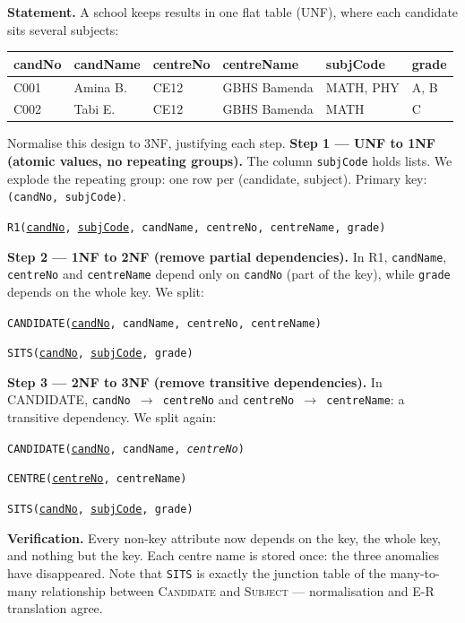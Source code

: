 \documentclass[11pt]{article}
\begin{document}
\begin{exoresolu}
\textbf{Statement.} A school keeps results in one flat table (UNF), where each candidate sits several subjects:

\begin{center}\small
\begin{tabular}{|l|l|l|l|l|l|}
\hline
\rowcolor{popblueL} candNo & candName & centreNo & centreName & subjCode & grade \\
\hline
C001 & Amina B. & CE12 & GBHS Bamenda & MATH, PHY & A, B \\
C002 & Tabi E. & CE12 & GBHS Bamenda & MATH & C \\
\hline
\end{tabular}
\end{center}

Normalise this design to 3NF, justifying each step.
\tcblower
\textbf{Step 1 — UNF to 1NF (atomic values, no repeating groups).} The column \texttt{subjCode} holds lists. We explode the repeating group: one row per (candidate, subject). Primary key: \texttt{(candNo, subjCode)}.

\texttt{R1(\underline{candNo}, \underline{subjCode}, candName, centreNo, centreName, grade)}

\textbf{Step 2 — 1NF to 2NF (remove partial dependencies).} In R1, \texttt{candName}, \texttt{centreNo} and \texttt{centreName} depend only on \texttt{candNo} (part of the key), while \texttt{grade} depends on the whole key. We split:

\texttt{CANDIDATE(\underline{candNo}, candName, centreNo, centreName)}

\texttt{SITS(\underline{candNo}, \underline{subjCode}, grade)}

\textbf{Step 3 — 2NF to 3NF (remove transitive dependencies).} In CANDIDATE, \texttt{candNo $\to$ centreNo} and \texttt{centreNo $\to$ centreName}: a transitive dependency. We split again:

\texttt{CANDIDATE(\underline{candNo}, candName, \emph{centreNo})}

\texttt{CENTRE(\underline{centreNo}, centreName)}

\texttt{SITS(\underline{candNo}, \underline{subjCode}, grade)}

\textbf{Verification.} Every non-key attribute now depends on the key, the whole key, and nothing but the key. Each centre name is stored once: the three anomalies have disappeared. Note that \texttt{SITS} is exactly the junction table of the many-to-many relationship between \textsc{Candidate} and \textsc{Subject} — normalisation and E-R translation agree.
\end{exoresolu}
\end{document}
